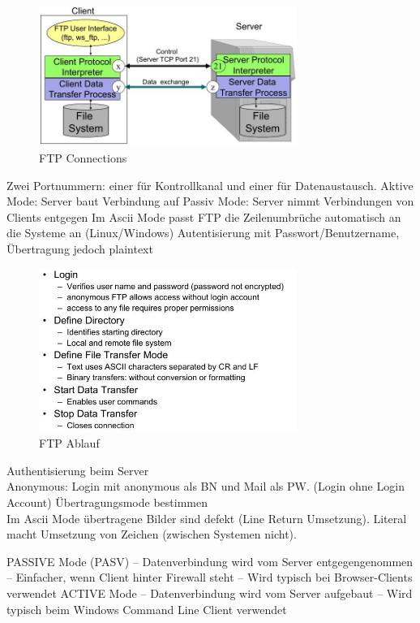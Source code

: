 \documentclass[ngerman,a4paper,12pt]{scrreprt}
\begin{document}

\begin{figure}[H]
	\centering
	\includegraphics[width=0.75\textwidth]{img/V14.3.jpg}
	\caption{FTP Connections}
	\label{}
\end{figure}

\ul
	\li Zwei Portnummern: einer für Kontrollkanal und einer für Datenaustausch.
	\li Aktive Mode: Server baut Verbindung auf
	\li Passiv Mode: Server nimmt Verbindungen von Clients entgegen
	\li Im Ascii Mode passt FTP die Zeilenumbrüche automatisch an die Systeme an (Linux/Windows)
	\li Autentisierung mit Passwort/Benutzername, Übertragung jedoch plaintext
\ulE

\begin{figure}[H]
	\centering
	\includegraphics[width=0.75\textwidth]{img/V14.4.jpg}
	\caption{FTP Ablauf}
	\label{}
\end{figure}

\ul
	\li Authentisierung beim Server
	\\ \ra Anonymous: Login mit anonymous als BN und Mail als PW. (Login ohne Login Account)
	\li Übertragungsmode bestimmen
	\\ \ra Im Ascii Mode übertragene Bilder sind defekt (Line Return Umsetzung).
	\li Literal macht Umsetzung von Zeichen (zwischen Systemen nicht).
	\li 
\ulE

\ul
\li PASSIVE Mode (PASV)
\ul
\li– Datenverbindung wird vom Server entgegengenommen
\li– Einfacher, wenn Client hinter Firewall steht
\li– Wird typisch bei Browser-Clients verwendet
\ulE
\li ACTIVE Mode
\ul \li– Datenverbindung wird vom Server aufgebaut
\li– Wird typisch beim Windows Command Line Client
verwendet\ulE
\ulE
\end{document}
